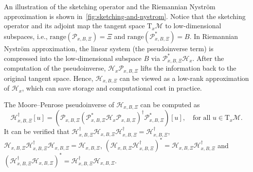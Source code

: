 \documentclass[final,onefignum,onetabnum]{siamart250211}
\begin{document}
An illustration of the sketching operator and the Riemannian Nystr\"om approximation is shown in~\cref{fig:sketching-and-nystrom}. 
Notice that the sketching operator and its adjoint map the tangent space $\mathrm{T}_x\mathcal{M}$ to low-dimensional subspaces, i.e., $\mathrm{range}(\mathcal{P}_{x,B,\Xi})=\Xi$ and $\mathrm{range}(\mathcal{P}_{x,B,\Xi}^{*})=B$. In Riemannian Nystr\"om approximation, the linear system (the pseudoinverse term) is compressed into the low-dimensional subspace $B$ via $\mathcal{P}_{x, B, \Xi}^* \mathcal{H}_x$. After the computation of the pseudoinverse, $\mathcal{H}_x \mathcal{P}_{x, B, \Xi}$ lifts the information back to the original tangent space. Hence, $\mathcal{H}_{x, B, \Xi}$ can be viewed as a low-rank approximation of $\mathcal{H}_x$, which can save storage and computational cost in practice.




The Moore--Penrose pseudoinverse of $\mathcal{H}_{x, B, \Xi}$ can be computed as
\begin{equation}
  \label{eq:Nystrom-Hessian-inverse}
\mathcal{H}_{x, B, \Xi}^{\dagger}[u]=\left(\mathcal{P}_{x, B, \Xi}\left(\mathcal{P}_{x, B, \Xi}^{*} \mathcal{H}_x \mathcal{P}_{x, B, \Xi}\right)^{\dagger} \mathcal{P}_{x, B, \Xi}^{*}\right)[u], \quad \text{for all } u \in \mathrm{T}_x \mathcal{M}.
\end{equation}
It can be verified that $\mathcal{H}_{x, B, \Xi}^{\dagger} \mathcal{H}_{x, B, \Xi} \mathcal{H}_{x, B, \Xi}^{\dagger} = \mathcal{H}_{x, B, \Xi}^{\dagger}$, $\mathcal{H}_{x, B, \Xi} \mathcal{H}_{x, B, \Xi}^{\dagger} \mathcal{H}_{x, B, \Xi} = \mathcal{H}_{x, B, \Xi}$, $(\mathcal{H}_{x, B, \Xi} \mathcal{H}_{x, B, \Xi}^{\dagger})^* = \mathcal{H}_{x, B, \Xi} \mathcal{H}_{x, B, \Xi}^{\dagger}$ and $(\mathcal{H}_{x, B, \Xi}^{\dagger}\mathcal{H}_{x, B, \Xi} )^* = \mathcal{H}_{x, B, \Xi}^{\dagger}\mathcal{H}_{x, B, \Xi}$.
\end{document}
